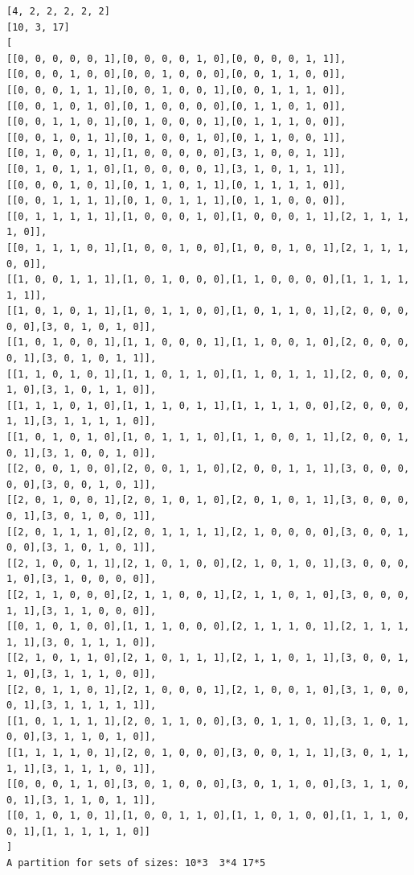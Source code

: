 \documentclass[final]{dmtcs-episciences}
\begin{document}
\begin{appendices}
\begin{verbatim} 
[4, 2, 2, 2, 2, 2]
[10, 3, 17]
[
[[0, 0, 0, 0, 0, 1],[0, 0, 0, 0, 1, 0],[0, 0, 0, 0, 1, 1]],
[[0, 0, 0, 1, 0, 0],[0, 0, 1, 0, 0, 0],[0, 0, 1, 1, 0, 0]],
[[0, 0, 0, 1, 1, 1],[0, 0, 1, 0, 0, 1],[0, 0, 1, 1, 1, 0]],
[[0, 0, 1, 0, 1, 0],[0, 1, 0, 0, 0, 0],[0, 1, 1, 0, 1, 0]],
[[0, 0, 1, 1, 0, 1],[0, 1, 0, 0, 0, 1],[0, 1, 1, 1, 0, 0]],
[[0, 0, 1, 0, 1, 1],[0, 1, 0, 0, 1, 0],[0, 1, 1, 0, 0, 1]],
[[0, 1, 0, 0, 1, 1],[1, 0, 0, 0, 0, 0],[3, 1, 0, 0, 1, 1]],
[[0, 1, 0, 1, 1, 0],[1, 0, 0, 0, 0, 1],[3, 1, 0, 1, 1, 1]],
[[0, 0, 0, 1, 0, 1],[0, 1, 1, 0, 1, 1],[0, 1, 1, 1, 1, 0]],
[[0, 0, 1, 1, 1, 1],[0, 1, 0, 1, 1, 1],[0, 1, 1, 0, 0, 0]],
[[0, 1, 1, 1, 1, 1],[1, 0, 0, 0, 1, 0],[1, 0, 0, 0, 1, 1],[2, 1, 1, 1, 1, 0]],
[[0, 1, 1, 1, 0, 1],[1, 0, 0, 1, 0, 0],[1, 0, 0, 1, 0, 1],[2, 1, 1, 1, 0, 0]],
[[1, 0, 0, 1, 1, 1],[1, 0, 1, 0, 0, 0],[1, 1, 0, 0, 0, 0],[1, 1, 1, 1, 1, 1]],
[[1, 0, 1, 0, 1, 1],[1, 0, 1, 1, 0, 0],[1, 0, 1, 1, 0, 1],[2, 0, 0, 0, 0, 0],[3, 0, 1, 0, 1, 0]],
[[1, 0, 1, 0, 0, 1],[1, 1, 0, 0, 0, 1],[1, 1, 0, 0, 1, 0],[2, 0, 0, 0, 0, 1],[3, 0, 1, 0, 1, 1]],
[[1, 1, 0, 1, 0, 1],[1, 1, 0, 1, 1, 0],[1, 1, 0, 1, 1, 1],[2, 0, 0, 0, 1, 0],[3, 1, 0, 1, 1, 0]],
[[1, 1, 1, 0, 1, 0],[1, 1, 1, 0, 1, 1],[1, 1, 1, 1, 0, 0],[2, 0, 0, 0, 1, 1],[3, 1, 1, 1, 1, 0]],
[[1, 0, 1, 0, 1, 0],[1, 0, 1, 1, 1, 0],[1, 1, 0, 0, 1, 1],[2, 0, 0, 1, 0, 1],[3, 1, 0, 0, 1, 0]],
[[2, 0, 0, 1, 0, 0],[2, 0, 0, 1, 1, 0],[2, 0, 0, 1, 1, 1],[3, 0, 0, 0, 0, 0],[3, 0, 0, 1, 0, 1]],
[[2, 0, 1, 0, 0, 1],[2, 0, 1, 0, 1, 0],[2, 0, 1, 0, 1, 1],[3, 0, 0, 0, 0, 1],[3, 0, 1, 0, 0, 1]],
[[2, 0, 1, 1, 1, 0],[2, 0, 1, 1, 1, 1],[2, 1, 0, 0, 0, 0],[3, 0, 0, 1, 0, 0],[3, 1, 0, 1, 0, 1]],
[[2, 1, 0, 0, 1, 1],[2, 1, 0, 1, 0, 0],[2, 1, 0, 1, 0, 1],[3, 0, 0, 0, 1, 0],[3, 1, 0, 0, 0, 0]],
[[2, 1, 1, 0, 0, 0],[2, 1, 1, 0, 0, 1],[2, 1, 1, 0, 1, 0],[3, 0, 0, 0, 1, 1],[3, 1, 1, 0, 0, 0]],
[[0, 1, 0, 1, 0, 0],[1, 1, 1, 0, 0, 0],[2, 1, 1, 1, 0, 1],[2, 1, 1, 1, 1, 1],[3, 0, 1, 1, 1, 0]],
[[2, 1, 0, 1, 1, 0],[2, 1, 0, 1, 1, 1],[2, 1, 1, 0, 1, 1],[3, 0, 0, 1, 1, 0],[3, 1, 1, 1, 0, 0]],
[[2, 0, 1, 1, 0, 1],[2, 1, 0, 0, 0, 1],[2, 1, 0, 0, 1, 0],[3, 1, 0, 0, 0, 1],[3, 1, 1, 1, 1, 1]],
[[1, 0, 1, 1, 1, 1],[2, 0, 1, 1, 0, 0],[3, 0, 1, 1, 0, 1],[3, 1, 0, 1, 0, 0],[3, 1, 1, 0, 1, 0]],
[[1, 1, 1, 1, 0, 1],[2, 0, 1, 0, 0, 0],[3, 0, 0, 1, 1, 1],[3, 0, 1, 1, 1, 1],[3, 1, 1, 1, 0, 1]],
[[0, 0, 0, 1, 1, 0],[3, 0, 1, 0, 0, 0],[3, 0, 1, 1, 0, 0],[3, 1, 1, 0, 0, 1],[3, 1, 1, 0, 1, 1]],
[[0, 1, 0, 1, 0, 1],[1, 0, 0, 1, 1, 0],[1, 1, 0, 1, 0, 0],[1, 1, 1, 0, 0, 1],[1, 1, 1, 1, 1, 0]]
]
A partition for sets of sizes: 10*3  3*4 17*5
\end{verbatim}
\newpage


\end{appendices}
\end{document}
